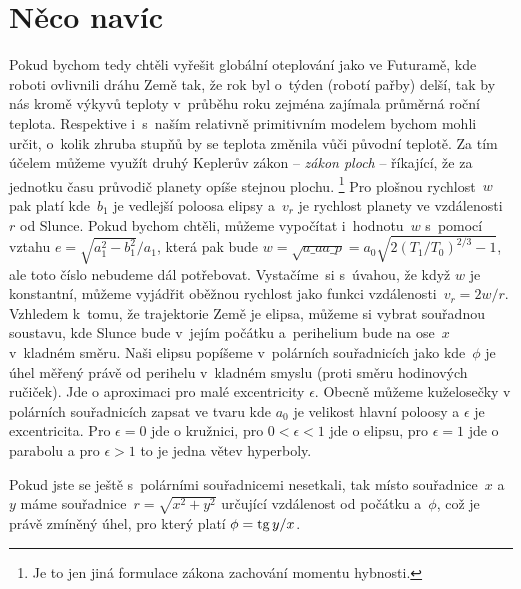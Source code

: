 \documentclass[twoside]{fksserie}
\begin{document}
\section{Něco navíc}

Pokud bychom tedy chtěli vyřešit globální oteplování jako ve Futuramě,
kde roboti ovlivnili dráhu Země tak, že rok byl o~týden (robotí pařby)
delší, tak by nás kromě výkyvů teploty v~průběhu roku zejména zajímala
průměrná roční teplota. Respektive i~s~naším relativně primitivním modelem
bychom mohli určit, o~kolik zhruba stupňů by se teplota změnila vůči 
původní teplotě. Za tím účelem můžeme využít druhý Keplerův zákon -- {\it zákon
ploch} -- říkající, že za jednotku času průvodič planety opíše stejnou plochu.%
\footnote{Je to jen jiná formulace zákona zachování momentu hybnosti.}
Pro plošnou rychlost~$w$ pak platí
kde~$b_1$ je vedlejší poloosa elipsy a~$v_r$ je rychlost planety ve 
vzdálenosti~$r$ od Slunce. Pokud bychom chtěli, můžeme vypočítat
i~hodnotu~$w$ s~pomocí vztahu $e = {\sqrt{a_1^2 - b_1^2}}/{a_1}$, 
která pak bude $w = \sqrt{a\_a a\_p} = a_0 
\sqrt{2 \left( {T_1}/{T_0} \right) ^{2/3} -1 }$, ale toto číslo
nebudeme dál potřebovat. Vystačíme~si s~úvahou, že když $w$ je 
konstantní, můžeme vyjádřit oběžnou rychlost jako funkci vzdálenosti~$v_r =
{2w}/{r}$.
Vzhledem k~tomu, že trajektorie Země je elipsa,
můžeme si vybrat souřadnou soustavu, kde Slunce bude v~jejím počátku
a~perihelium bude na ose~$x$ v~kladném směru. Naši elipsu popíšeme v~polárních 
souřadnicích jako 
kde~$\phi$ je úhel měřený právě od perihelu v~kladném smyslu (proti směru 
hodinových ručiček). Jde o aproximaci pro malé excentricity $\epsilon$. 
Obecně můžeme kuželosečky v polárních souřadnicích zapsat ve tvaru 
kde $a_0$ je velikost hlavní poloosy a $\epsilon$ je excentricita. Pro 
$\epsilon=0$ jde o kružnici, pro $0<\epsilon<1$ jde o elipsu, pro 
$\epsilon=1$ jde o parabolu a pro $\epsilon>1$ to je jedna větev hyperboly.

Pokud jste se ještě s~polárními souřadnicemi nesetkali,
tak místo souřadnice~$x$ a~$y$ máme souřadnice~$r = \sqrt{x^2 + y^2}$ 
určující vzdálenost od počátku a~$\phi$, což je právě zmíněný úhel, pro
který platí $\phi = \mathop\mathrm{tg}\nolimits {y}/{x}$.
\end{document}

